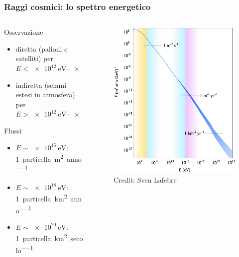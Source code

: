 \documentclass[10pt]{beamer}
\begin{document}
\begin{frame}
  \frametitle{Raggi cosmici: lo spettro energetico}
  \begin{columns}
    \begin{column}{0.55\columnwidth}
      Osservazione
      \begin{itemize}
      \item diretta (palloni e satelliti) per
        $E < \SIrange[range-phrase=-]{e12}{e14}{\electronvolt}$
      \item indiretta (sciami estesi in atmosfera) per
        $E > \SIrange[range-phrase=-]{e12}{e14}{\electronvolt}$
      \end{itemize}
      Flussi
      \begin{itemize}
      \item $E \sim \SI{e15}{\electronvolt}$:
        \SI{1}{particella\per\metre\squared\per anno}
      \item $E \sim \SI{e18}{\electronvolt}$:
        \SI{1}{particella\per\kilo\metre\squared\per anno}
      \item $E \sim \SI{e20}{\electronvolt}$:
        \SI{1}{particella\per\kilo\metre\squared\per secolo}
      \end{itemize}
    \end{column}
    \begin{column}{0.45\columnwidth}
      \begin{figure}
        \centering
        \includegraphics[width=\columnwidth]{cr-spectrum}
        \caption{Credit: Sven Lafebre}
      \end{figure}
    \end{column}
  \end{columns}
\end{frame}
\end{document}
